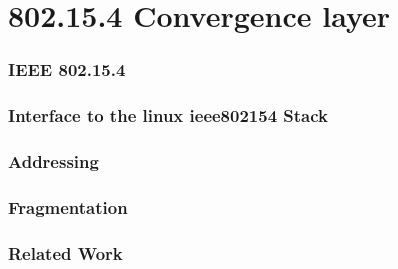 \chapter{802.15.4 Convergence layer}
\subsection{IEEE 802.15.4}
\subsection{Interface to the linux ieee802154 Stack}
\subsection{Addressing}
\subsection{Fragmentation}
\subsection{Related Work}
